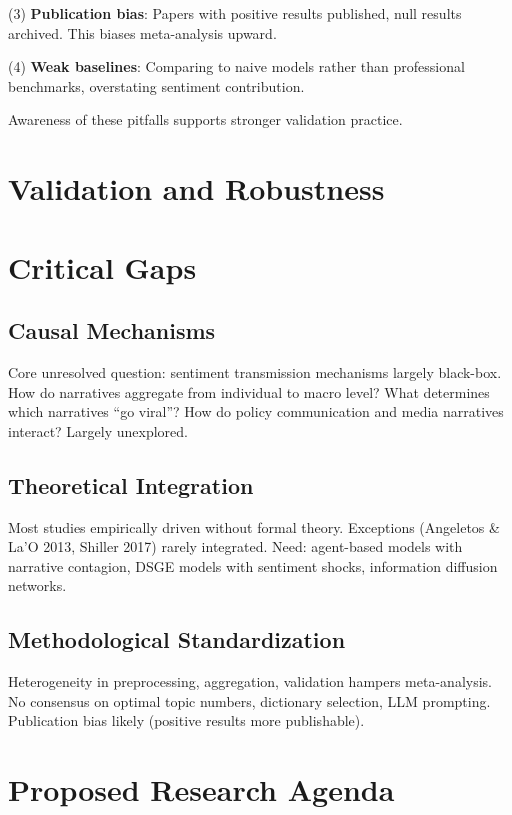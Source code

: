 \documentclass[11pt]{article}
\begin{document}
\noindent
(3) \textbf{Publication bias}: Papers with positive results published, null results archived. This biases meta-analysis upward.

\noindent
(4) \textbf{Weak baselines}: Comparing to naive models rather than professional benchmarks, overstating sentiment contribution.

Awareness of these pitfalls supports stronger validation practice.

\section{Validation and Robustness}

\section{Critical Gaps}

\subsection{Causal Mechanisms}

Core unresolved question: sentiment transmission mechanisms largely black-box. How do narratives aggregate from individual to macro level? What determines which narratives ``go viral''? How do policy communication and media narratives interact? Largely unexplored.

\subsection{Theoretical Integration}

Most studies empirically driven without formal theory. Exceptions (Angeletos \& La'O 2013, Shiller 2017) rarely integrated. Need: agent-based models with narrative contagion, DSGE models with sentiment shocks, information diffusion networks.

\subsection{Methodological Standardization}

Heterogeneity in preprocessing, aggregation, validation hampers meta-analysis. No consensus on optimal topic numbers, dictionary selection, LLM prompting. Publication bias likely (positive results more publishable).

\section{Proposed Research Agenda}
\end{document}
